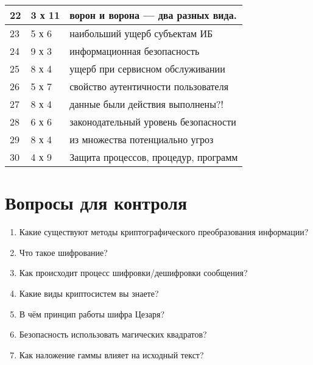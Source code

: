 \begin{table} [htbp]
{\begin{SingleSpace}
\begin{tabular}{|l|l|l|}
      22 & 3 х 11 & ворон и ворона — два разных вида. \\ \hline
      23 & 5 х 6 & наибольший ущерб субъектам ИБ \\ \hline
      24 & 9 х 3 & информационная безопасность \\ \hline
      25 & 8 х 4 & ущерб при сервисном обслуживании \\ \hline
      26 & 5 х 7 & свойство аутентичности пользователя \\ \hline
      27 & 8 х 4 & данные были действия выполнены?! \\ \hline
      28 & 6 х 6 & законодательный уровень безопасности \\ \hline
      29 & 8 х 4 & из множества потенциально угроз \\ \hline
      30 & 4 х 9 & Защита процессов, процедур, программ \\ \hline
      \end{tabular}%
    \end{SingleSpace}
  }
\end{table}



\section{Вопросы для контроля}\label{sect8_e}
%
\begin{enumerate}
  \item Какие существуют методы криптографического преобразования
      информации?
  \item Что такое шифрование?
  \item Как происходит процесс шифровки/дешифровки сообщения?
  \item Какие виды криптосистем вы знаете?
  \item В чём принцип работы шифра Цезаря?
  \item Безопасность использовать магических квадратов?
  \item Как наложение гаммы влияет на исходный текст?
\end{enumerate}
